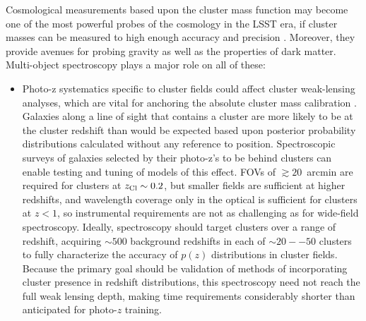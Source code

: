 Cosmological measurements based upon the cluster mass function may become one of the most powerful probes of the cosmology in the LSST era, if cluster masses can be measured to high enough accuracy and precision \citep{visions,Krause}.  Moreover, they provide avenues for probing gravity as well as the properties of dark matter.  Multi-object spectroscopy plays a major role on all of these:

\begin{itemize}
\item Photo-z systematics specific to cluster fields could affect cluster weak-lensing analyses, which are vital for anchoring the absolute cluster mass calibration \citep{Applegate}.  Galaxies along a line of sight that contains a cluster are more likely to be at the cluster redshift than would be expected based upon posterior probability distributions calculated without any reference to position.  %
Spectroscopic surveys of galaxies selected by their photo-z's to be behind clusters can enable testing and tuning of models of this effect.  FOVs of $\gtrsim 20$~arcmin are required for clusters at $z_{\rm Cl}\sim 0.2$, but smaller fields are sufficient at higher redshifts, and wavelength coverage only in the optical is sufficient for clusters at $z<1$, so instrumental requirements are not as challenging as for wide-field spectroscopy.  
Ideally, spectroscopy should target clusters over a range of redshift, acquiring $\sim 500$ background redshifts in each of  $\sim 20--50$ clusters to fully characterize the accuracy of $p(z)$ distributions in cluster fields.  Because the primary goal should be validation of methods of incorporating cluster presence in redshift distributions, this spectroscopy need not reach the full weak lensing depth, making time requirements considerably shorter than anticipated for photo-$z$ training.


\end{itemize}
